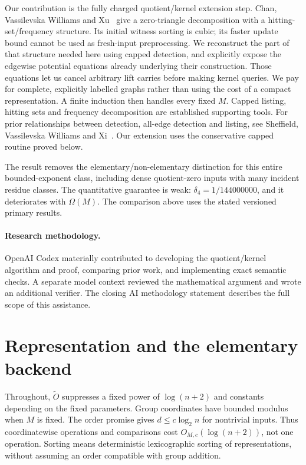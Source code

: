 \documentclass[manuscript,screen,nonacm,11pt]{acmart}
\newcommand{\Ot}{\widetilde O}
\newcommand{\Om}{\Omega}
\begin{document}
Our contribution is the fully charged quotient/kernel extension step.
Chan, Vassilevska Williams and Xu~\cite[Theorem~5.1]{CVX23} give a
zero-triangle decomposition with a hitting-set/frequency structure. Its
initial witness sorting is cubic; its faster update bound cannot be used
as fresh-input preprocessing. We reconstruct the part of that structure
needed here using capped detection, and explicitly expose the edgewise
potential equations already underlying their construction. Those equations
let us cancel arbitrary lift carries before making kernel queries. We pay
for complete, explicitly labelled graphs rather than using the cost of a
compact representation. A finite induction then handles every fixed $M$.
Capped listing, hitting sets and frequency decomposition are established
supporting tools. For prior relationships between detection, all-edge
detection and listing, see Sheffield, Vassilevska Williams and Xi~\cite{SWX26}.
Our extension uses the conservative capped routine proved below.

The result removes the elementary/non-elementary distinction for this entire
bounded-exponent class, including dense quotient-zero inputs with many
incident residue classes. The quantitative guarantee is weak:
$\delta_4=1/144000000$, and it deteriorates with $\Om(M)$. The comparison
above uses the stated versioned primary results.

\paragraph{Research methodology.}
OpenAI Codex materially contributed to developing the quotient/kernel
algorithm and proof, comparing prior work, and implementing exact semantic
checks. A separate model context reviewed the mathematical argument and
wrote an additional verifier. The closing AI methodology statement describes
the full scope of this assistance.

\section{Representation and the elementary backend}\label{sec:backend}

Throughout, $\Ot$ suppresses a fixed power of $\log(n+2)$ and constants
depending on the fixed parameters. Group coordinates have bounded modulus
when $M$ is fixed. The order promise gives $d\le c\log_2 n$ for nontrivial
inputs. Thus coordinatewise operations and comparisons cost $O_{M,c}(\log(n+2))$,
not one operation. Sorting means deterministic lexicographic sorting of
representations, without assuming an order compatible with group addition.
\end{document}
